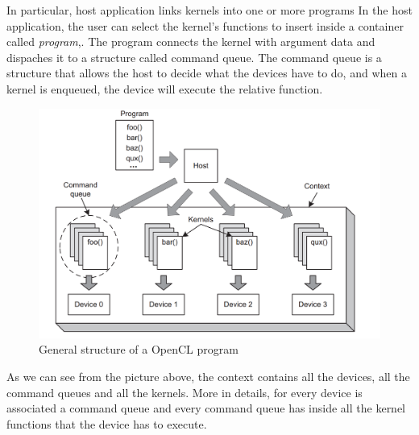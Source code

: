 In particular, host application links kernels into one or more programs In the host application, the user can select the kernel's functions to insert inside a container called \emph{program},.  The program connects the kernel with argument data and dispaches it to a structure called command queue.  The command queue is a structure that allows the host to decide what the devices have to do, and when a kernel is enqueued, the device will execute the relative function.

\begin{figure}[htp]
  \begin{center}
    \includegraphics[width=12cm]{./images/OpenCAL-CL/kernelDistribution}
    \caption{General structure of a OpenCL program}
    \label{fig:GeneralStructure}
  \end{center}
\end{figure}

As we can see from the picture above, the context contains all the devices, all the command queues and all the kernels.
More in details, for every device is associated a command queue and every command queue has inside all the kernel functions
that the device has to execute.

